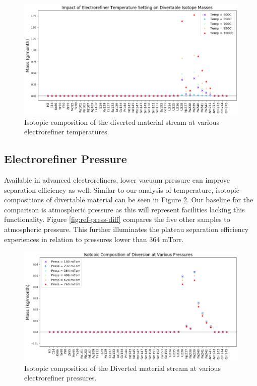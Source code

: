 \begin{figure}
	\includegraphics[width=\linewidth]{images/temperature-sa-diff}
	\caption{Isotopic composition of the diverted material stream at various electrorefiner temperatures.}
	\label{fig:ref-temp-diff}
\end{figure}
\vspace{-2mm}
\subsection{Electrorefiner Pressure}

Available in advanced electrorefiners, lower vacuum pressure can improve separation efficiency as well. Similar to our analysis of temperature, isotopic compositions of
divertable material can be seen in Figure \ref{fig:ref-press-sa}. Our baseline for the comparison is atmospheric pressure as this will represent facilities lacking this
functionality. Figure \ref{fig:ref-press-diff} compares the five other samples to atmospheric pressure. This further illuminates the plateau separation efficiency experiences in relation to pressures lower than 364 mTorr.

\begin{figure}
	\includegraphics[width=\linewidth]{images/pressure-sa-comp}
	\caption{Isotopic composition of the Diverted material stream at various electrorefiner pressures.}
	\label{fig:ref-press-sa}
\end{figure}


